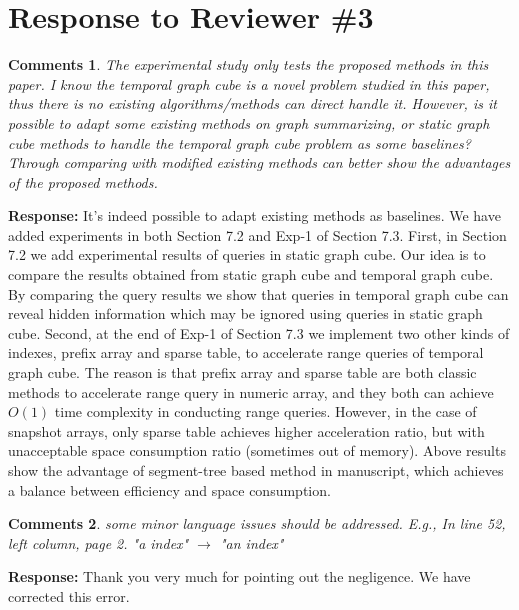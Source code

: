\documentclass{article}
\newtheorem{Comments}{\textbf{Comments}}
\begin{document}
\section{Response to Reviewer \#3}
\setcounter{Comments}{0}
\begin{Comments}
The experimental study only tests the proposed methods in this paper. I know the temporal graph cube is a novel problem studied in this paper, thus there is no existing algorithms/methods can direct handle it. However, is it possible to adapt some existing methods on graph summarizing, or static graph cube methods to handle the temporal graph cube problem as some baselines? Through comparing with modified existing methods can better show the advantages of the proposed methods.
\end{Comments}
\noindent \textbf{Response:} It's indeed possible to adapt existing methods as baselines. We have added experiments in both Section 7.2 and Exp-1 of Section 7.3. First, in Section 7.2 we add experimental results of queries in static graph cube. Our idea is to compare the results obtained from static graph cube and temporal graph cube. By comparing the query results we show that queries in temporal graph cube can reveal hidden information which may be ignored using queries in static graph cube. Second, at the end of Exp-1 of Section 7.3 we implement two other kinds of indexes, prefix array and sparse table, to accelerate range queries of temporal graph cube. The reason is that prefix array and sparse table are both classic methods to accelerate range query in numeric array, and they both can achieve $ O(1) $ time complexity in conducting range queries. However, in the case of snapshot arrays, only sparse table achieves higher acceleration ratio, but with unacceptable space consumption ratio (sometimes out of memory). Above results show the advantage of segment-tree based method in manuscript, which achieves a balance between efficiency and space consumption.


\begin{Comments}
 some minor language issues should be addressed. E.g., In line 52, left column, page 2. "a index" $ \rightarrow $ "an index"
\end{Comments}
\noindent \textbf{Response:} Thank you very much for pointing out the negligence. We have corrected this error.
\end{document}

